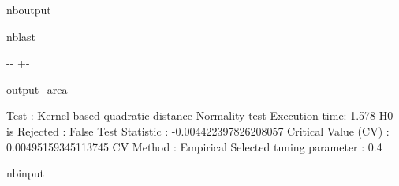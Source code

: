 \documentclass[letterpaper,10pt,english,openany,oneside]{sphinxmanual}
\begin{document}
\begin{sphinxuseclass}{nboutput}
\begin{sphinxuseclass}{nblast}
{

\kern-\sphinxverbatimsmallskipamount\kern-\baselineskip
\kern+\FrameHeightAdjust\kern-\fboxrule
\vspace{\nbsphinxcodecellspacing}

\begin{sphinxuseclass}{output_area}
\begin{sphinxuseclass}{}


\begin{sphinxVerbatim}[commandchars=\\\{\}]
Test : Kernel-based quadratic distance Normality test
Execution time: 1.578
H0 is Rejected : False
Test Statistic : -0.004422397826208057
Critical Value (CV) : 0.00495159345113745
CV Method : Empirical
Selected tuning parameter : 0.4
\end{sphinxVerbatim}



\end{sphinxuseclass}
\end{sphinxuseclass}
}

\end{sphinxuseclass}
\end{sphinxuseclass}
\begin{sphinxuseclass}{nbinput}
{
\begin{sphinxVerbatim}[commandchars=\\\{\}]
\llap{\color{nbsphinxin}[2]:\,\hspace{\fboxrule}\hspace{\fboxsep}}
\end{sphinxVerbatim}
}

\end{sphinxuseclass}
\end{document}
